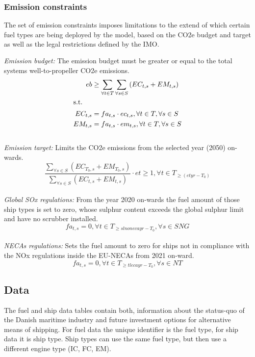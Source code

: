 \documentclass[article]{elsarticle}
\begin{document}
\subsubsection{Emission constraints}
The set of emission constraints imposes limitations to the extend of which certain fuel types are being deployed by the model, based on the CO2e budget and target as well as the legal restrictions defined by the IMO.
\\\par\noindent
\textit{Emission budget: }The emission budget must be greater or equal to the total systems well-to-propeller CO2e emissions.
\begin{subequations}
    \begin{align}
    eb &\geq \sum_{\forall t \in T}\sum_{\forall s \in S}\left(EC_{t,s} + EM_{t,s} \right) \label{eq:co2ebudget}\\
    \intertext{s.t.}
    EC_{t,s} &= fa_{t,s} \cdot ec_{t,s}, \forall t \in T, \forall s \in S\\
    EM_{t,s} &= fa_{t,s} \cdot em_{t,s}, \forall t \in T, \forall s \in S
    \end{align}
\end{subequations}\\
\textit{Emission target: }Limits the CO2e emissions from the selected year (2050) on-wards.
\begin{equation}
    \frac{\sum_{\forall s \in S} \left(EC_{T_0,s}+EM_{T_0,s}\right)}{\sum_{\forall s \in S} \left(EC_{t,s}+EM_{t,s}\right)} \cdot et \geq 1, \forall t \in T_{\geq \left(etyr-T_0\right)}
\end{equation}\\
\textit{Global SOx regulations: }From the year 2020 on-wards the fuel amount of those ship types is set to zero, whose sulphur content exceeds the global sulphur limit and have no scrubber installed.
\begin{equation}
    fa_{t,s} = 0, \forall t \in T_{\geq slnonecayr-T_0}, \forall s \in SNG \label{eq:sox_global}
\end{equation}\\
\textit{NECAs regulations: }Sets the fuel amount to zero for ships not in compliance with the NOx regulations inside the EU-NECAs from 2021 on-ward.
\begin{equation}
   fa_{t,s} = 0, \forall t \in T_{\geq tlecayr-T_0},\forall s \in NT \label{eq:tier}
\end{equation}


\subsection{Data}
\label{subsec:Dat}
The fuel and ship data tables contain both, information about the status-quo of the Danish maritime industry and future investment options for alternative means of shipping. For fuel data the unique identifier is the fuel type, for ship data it is ship type. Ship types can use the same fuel type, but then use a different engine type (IC, FC, EM).
\end{document}
